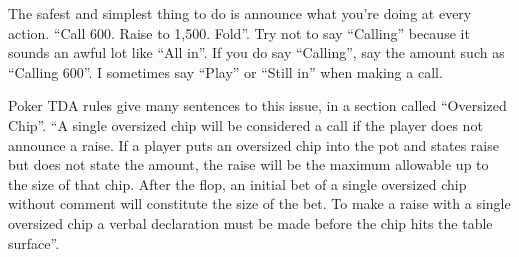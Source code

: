 The safest and simplest thing to do is announce what you're doing
at every action. ``Call 600. Raise to 1,500. Fold''. Try not to
say ``Calling'' because it sounds an awful lot like ``All in''.
If you do say ``Calling'', say the amount such as ``Calling 600''.
I sometimes say ``Play'' or ``Still in'' when making a call.

Poker TDA rules give many sentences to this issue, in a section
called ``Oversized Chip''. ``A single oversized chip will be considered
a call if the player does not announce a raise. If a player puts an
oversized chip into the pot and states raise but does not state the
amount, the raise will be the maximum allowable up to the size of that
chip. After the flop, an initial bet of a single oversized chip
without comment will constitute the size of the bet. To make a raise
with a single oversized chip a verbal declaration must be made
before the chip hits the table surface''.





